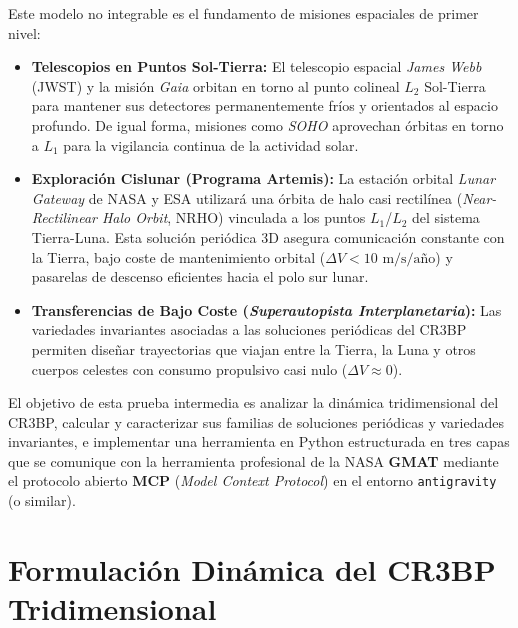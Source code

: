 \documentclass[11pt, a4paper]{article}
\begin{document}
	Este modelo no integrable es el fundamento de misiones espaciales de primer nivel:
	\begin{itemize}[leftmargin=*]
		\item \textbf{Telescopios en Puntos Sol-Tierra:} El telescopio espacial \textit{James Webb} (JWST) y la misión \textit{Gaia} orbitan en torno al punto colineal $L_2$ Sol-Tierra para mantener sus detectores permanentemente fríos y orientados al espacio profundo. De igual forma, misiones como \textit{SOHO} aprovechan órbitas en torno a $L_1$ para la vigilancia continua de la actividad solar.
		\item \textbf{Exploración Cislunar (Programa Artemis):} La estación orbital \textit{Lunar Gateway} de NASA y ESA utilizará una órbita de halo casi rectilínea (\textit{Near-Rectilinear Halo Orbit}, NRHO) vinculada a los puntos $L_1$/$L_2$ del sistema Tierra-Luna. Esta solución periódica 3D asegura comunicación constante con la Tierra, bajo coste de mantenimiento orbital ($\Delta V < 10\text{ m/s/año}$) y pasarelas de descenso eficientes hacia el polo sur lunar.
		\item \textbf{Transferencias de Bajo Coste (\textit{Superautopista Interplanetaria}):} Las variedades invariantes asociadas a las soluciones periódicas del CR3BP permiten diseñar trayectorias que viajan entre la Tierra, la Luna y otros cuerpos celestes con consumo propulsivo casi nulo ($\Delta V \approx 0$).
	\end{itemize}
	
	El objetivo de esta prueba intermedia es analizar la dinámica tridimensional del CR3BP, calcular y caracterizar sus familias de soluciones periódicas y variedades invariantes, e implementar una herramienta en Python estructurada en tres capas que se comunique con la herramienta profesional de la NASA \textbf{GMAT} mediante el protocolo abierto \textbf{MCP} (\textit{Model Context Protocol}) en el entorno \texttt{antigravity} (o similar).
	
	\section{Formulación Dinámica del CR3BP Tridimensional}
	
\end{document}
